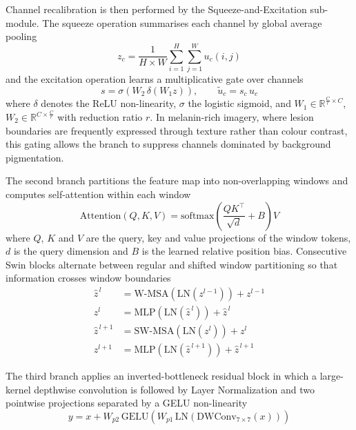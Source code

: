 \documentclass[pdflatex,sn-mathphys-num]{sn-jnl}%
\begin{document}
Channel recalibration is then performed by the Squeeze-and-Excitation sub-module. The squeeze
operation summarises each channel by global average pooling
\begin{equation}
z_{c} = \frac{1}{H \times W} \sum_{i=1}^{H} \sum_{j=1}^{W} u_{c}(i,j)
\end{equation}
and the excitation operation learns a multiplicative gate over channels
\begin{equation}
s = \sigma\!\left(W_{2}\, \delta(W_{1} z)\right), \qquad \tilde{u}_{c} = s_{c}\, u_{c}
\end{equation}
where $\delta$ denotes the ReLU non-linearity, $\sigma$ the logistic sigmoid, and
$W_{1} \in \mathbb{R}^{\frac{C}{r} \times C}$,
$W_{2} \in \mathbb{R}^{C \times \frac{C}{r}}$ with reduction ratio $r$. In melanin-rich
imagery, where lesion boundaries are frequently expressed through texture rather than colour
contrast, this gating allows the branch to suppress channels dominated by background
pigmentation.

The second branch partitions the feature map into non-overlapping windows and computes
self-attention within each window
\begin{equation}
\mathrm{Attention}(Q,K,V) = \mathrm{softmax}\!\left(\frac{QK^{\top}}{\sqrt{d}} + B\right) V
\end{equation}
where $Q$, $K$ and $V$ are the query, key and value projections of the window tokens, $d$ is
the query dimension and $B$ is the learned relative position bias. Consecutive Swin blocks
alternate between regular and shifted window partitioning so that information crosses window
boundaries
\begin{align}
\hat{z}^{\,l} &= \mathrm{W\text{-}MSA}\!\left(\mathrm{LN}\!\left(z^{l-1}\right)\right) + z^{l-1} \\
z^{l} &= \mathrm{MLP}\!\left(\mathrm{LN}\!\left(\hat{z}^{\,l}\right)\right) + \hat{z}^{\,l} \\
\hat{z}^{\,l+1} &= \mathrm{SW\text{-}MSA}\!\left(\mathrm{LN}\!\left(z^{l}\right)\right) + z^{l} \\
z^{l+1} &= \mathrm{MLP}\!\left(\mathrm{LN}\!\left(\hat{z}^{\,l+1}\right)\right) + \hat{z}^{\,l+1}
\end{align}

The third branch applies an inverted-bottleneck residual block in which a large-kernel
depthwise convolution is followed by Layer Normalization and two pointwise projections
separated by a GELU non-linearity
\begin{equation}
y = x + W_{p2}\, \mathrm{GELU}\!\left(W_{p1}\, \mathrm{LN}\!\left(\mathrm{DWConv}_{7\times7}(x)\right)\right)
\end{equation}
\end{document}
